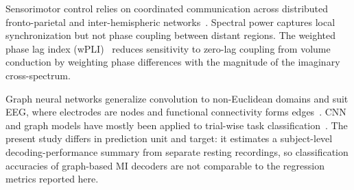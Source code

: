 \documentclass{ieeeaccess}
\begin{document}
Sensorimotor control relies on coordinated communication across distributed fronto-parietal and inter-hemispheric networks~\cite{hamedi2016,zhang2015network}. Spectral power captures local synchronization but not phase coupling between distant regions. The weighted phase lag index (wPLI)~\cite{vinck2011} reduces sensitivity to zero-lag coupling from volume conduction by weighting phase differences with the magnitude of the imaginary cross-spectrum.

Graph neural networks generalize convolution to non-Euclidean domains and suit EEG, where electrodes are nodes and functional connectivity forms edges~\cite{kipf2017,velickovic2018,hamilton2017}. CNN and graph models have mostly been applied to trial-wise task classification~\cite{schirrmeister2017,lawhern2018,sun2023graph,xue2024,shi2024}. The present study differs in prediction unit and target: it estimates a subject-level decoding-performance summary from separate resting recordings, so classification accuracies of graph-based MI decoders are not comparable to the regression metrics reported here.
\end{document}
